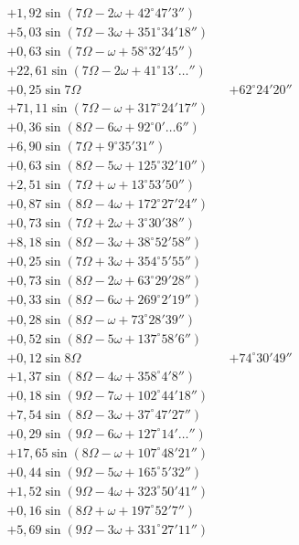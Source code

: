 \documentclass[10pt,a4paper]{article}
\begin{document}
\begin{align*}
&+ 1,92 \sin(7\Omega - 2\omega + 42^{\circ}47'3'') \\
&+ 5,03 \sin(7\Omega - 3\omega + 351^{\circ}34'18'') \\
&+ 0,63 \sin(7\Omega - \omega + 58^{\circ}32'45'') \\
&+ 22,61 \sin(7\Omega - 2\omega + 41^{\circ}13'\ldots'') \\
&+ 0,25 \sin 7\Omega &&+ 62^{\circ}24'20'' \\
&+ 71,11 \sin(7\Omega - \omega + 317^{\circ}24'17'') \\
&+ 0,36 \sin(8\Omega - 6\omega + 92^{\circ}0'\ldots6'') \\
&+ 6,90 \sin(7\Omega + 9^{\circ}35'31'') \\
&+ 0,63 \sin(8\Omega - 5\omega + 125^{\circ}32'10'') \\
&+ 2,51 \sin(7\Omega + \omega + 13^{\circ}53'50'') \\
&+ 0,87 \sin(8\Omega - 4\omega + 172^{\circ}27'24'') \\
&+ 0,73 \sin(7\Omega + 2\omega + 3^{\circ}30'38'') \\
&+ 8,18 \sin(8\Omega - 3\omega + 38^{\circ}52'58'') \\
&+ 0,25 \sin(7\Omega + 3\omega + 354^{\circ}5'55'') \\
&+ 0,73 \sin(8\Omega - 2\omega + 63^{\circ}29'28'') \\
&+ 0,33 \sin(8\Omega - 6\omega + 269^{\circ}2'19'') \\
&+ 0,28 \sin(8\Omega - \omega + 73^{\circ}28'39'') \\
&+ 0,52 \sin(8\Omega - 5\omega + 137^{\circ}58'6'') \\
&+ 0,12 \sin 8\Omega &&+ 74^{\circ}30'49'' \\
&+ 1,37 \sin(8\Omega - 4\omega + 358^{\circ}4'8'') \\
&+ 0,18 \sin(9\Omega - 7\omega + 102^{\circ}44'18'') \\
&+ 7,54 \sin(8\Omega - 3\omega + 37^{\circ}47'27'') \\
&+ 0,29 \sin(9\Omega - 6\omega + 127^{\circ}14'\ldots'') \\
&+ 17,65 \sin(8\Omega - \omega + 107^{\circ}48'21'') \\
&+ 0,44 \sin(9\Omega - 5\omega + 165^{\circ}5'32'') \\
&+ 1,52 \sin(9\Omega - 4\omega + 323^{\circ}50'41'') \\
&+ 0,16 \sin(8\Omega + \omega + 197^{\circ}52'7'') \\
&+ 5,69 \sin(9\Omega - 3\omega + 331^{\circ}27'11'') \\

\end{align*}
\end{document}
